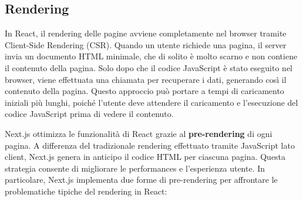\documentclass[target=bach,aauheader=,style=]{thud}
\begin{document}
\subsection{Rendering}
In React, il rendering delle pagine avviene completamente nel browser tramite Client-Side Rendering (CSR). Quando un utente richiede una pagina, il server invia un documento HTML minimale, che di solito è molto scarno e non contiene il contenuto della pagina. Solo dopo che il codice JavaScript è stato eseguito nel browser, viene effettuata una chiamata per recuperare i dati, generando così il contenuto della pagina. Questo approccio può portare a tempi di caricamento iniziali più lunghi, poiché l'utente deve attendere il caricamento e l'esecuzione del codice JavaScript prima di vedere il contenuto.

\noindent Next.js ottimizza le funzionalità di React grazie al \textbf{pre-rendering} di ogni pagina. A differenza del tradizionale rendering effettuato tramite JavaScript lato client, Next.js genera in anticipo il codice HTML per ciascuna pagina. Questa strategia consente di migliorare le performances e l'esperienza utente. In particolare, Next.js implementa due forme di pre-rendering per affrontare le problematiche tipiche del rendering in React:
\end{document}

